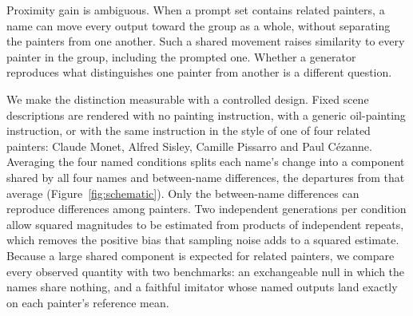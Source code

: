 \documentclass[10pt]{article}
\begin{document}
Proximity gain is ambiguous. When a prompt set contains related painters, a name can move
every output toward the group as a whole, without separating the painters from one another.
Such a shared movement raises similarity to every painter in the group, including the
prompted one. Whether a generator reproduces what distinguishes one painter from another is
a different question.

We make the distinction measurable with a controlled design. Fixed scene descriptions are
rendered with no painting instruction, with a generic oil-painting instruction, or with the
same instruction in the style of one of four related painters: Claude Monet, Alfred Sisley,
Camille Pissarro and Paul C\'ezanne. Averaging the four named conditions splits each name's
change into a component shared by all four names and between-name differences, the
departures from that average (Figure~\ref{fig:schematic}). Only the between-name
differences can reproduce differences among painters. Two independent generations per
condition allow squared magnitudes to be estimated from products of independent repeats,
which removes the positive bias that sampling noise adds to a squared estimate. Because a
large shared component is expected for related painters, we compare every observed quantity
with two benchmarks: an exchangeable null in which the names share nothing, and a faithful
imitator whose named outputs land exactly on each painter's reference mean.
\end{document}
